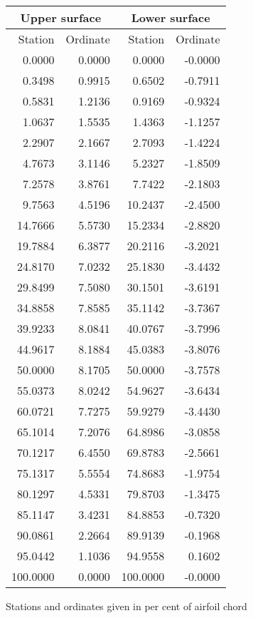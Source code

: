 \documentclass[11pt]{book}
\begin{document}
 \hspace{4mm}
 \begin{tabular}{|r|r|r|r|} \hline 
 \multicolumn{2}{|c|}{Upper surface} & \multicolumn{2}{|c|}{Lower surface} \\
 \hline
 Station & Ordinate & Station & Ordinate \\
 \hline
0.0000 & 0.0000 & 0.0000 & -0.0000 \\
0.3498 & 0.9915 & 0.6502 & -0.7911 \\
0.5831 & 1.2136 & 0.9169 & -0.9324 \\
1.0637 & 1.5535 & 1.4363 & -1.1257 \\
2.2907 & 2.1667 & 2.7093 & -1.4224 \\
4.7673 & 3.1146 & 5.2327 & -1.8509 \\
7.2578 & 3.8761 & 7.7422 & -2.1803 \\
9.7563 & 4.5196 & 10.2437 & -2.4500 \\
14.7666 & 5.5730 & 15.2334 & -2.8820 \\
19.7884 & 6.3877 & 20.2116 & -3.2021 \\
24.8170 & 7.0232 & 25.1830 & -3.4432 \\
29.8499 & 7.5080 & 30.1501 & -3.6191 \\
34.8858 & 7.8585 & 35.1142 & -3.7367 \\
39.9233 & 8.0841 & 40.0767 & -3.7996 \\
44.9617 & 8.1884 & 45.0383 & -3.8076 \\
50.0000 & 8.1705 & 50.0000 & -3.7578 \\
55.0373 & 8.0242 & 54.9627 & -3.6434 \\
60.0721 & 7.7275 & 59.9279 & -3.4430 \\
65.1014 & 7.2076 & 64.8986 & -3.0858 \\
70.1217 & 6.4550 & 69.8783 & -2.5661 \\
75.1317 & 5.5554 & 74.8683 & -1.9754 \\
80.1297 & 4.5331 & 79.8703 & -1.3475 \\
85.1147 & 3.4231 & 84.8853 & -0.7320 \\
90.0861 & 2.2664 & 89.9139 & -0.1968 \\
95.0442 & 1.1036 & 94.9558 & 0.1602 \\
100.0000 & 0.0000 & 100.0000 & -0.0000 \\
 \hline 
 \end{tabular}
 \vspace{8mm}

Stations and ordinates given in per cent of airfoil chord
\end{document}
